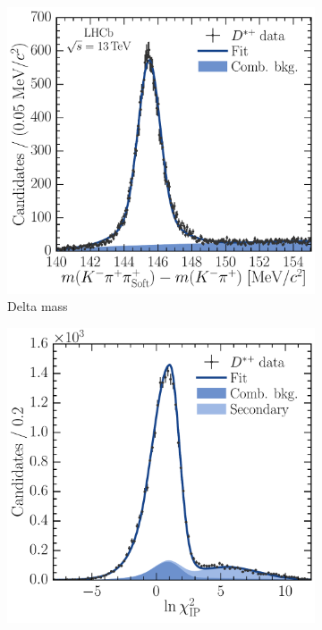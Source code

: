 \begin{figure}
  \begin{subfigure}[b]{0.5\textwidth}
    \centering
    \includegraphics[width=\textwidth]{figures/production/fitting/DstToD0pi_D0ToKpi_delta_mass_fit_pT_7_y_2}
    \caption{Delta mass}
    \label{fig:prod:fitting:DstToD0pi_D0ToKpi:delta_mass_high_sig}
  \end{subfigure}
  \begin{subfigure}[b]{0.5\textwidth}
    \centering
    \includegraphics[width=\textwidth]{figures/production/fitting/DstToD0pi_D0ToKpi_ipchisq_fit_pT_7_y_2}

\end{subfigure}
\end{figure}

